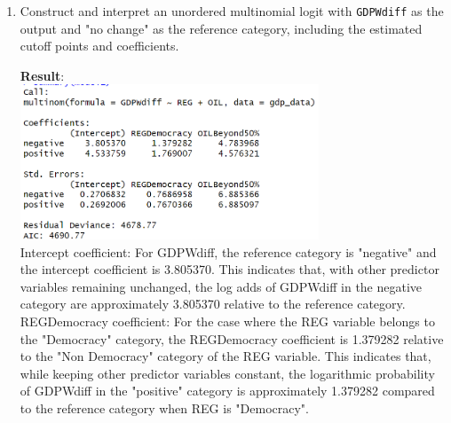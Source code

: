 \documentclass[12pt,letterpaper]{article}
\begin{document}
\begin{enumerate}
	\item Construct and interpret an unordered multinomial logit with \texttt{GDPWdiff} as the output and "no change" as the reference category, including the estimated cutoff points and coefficients.
	 
	\textbf{Result}:\\
	\includegraphics[width=0.7\textwidth]{Q1_1.png}\\
	Intercept coefficient: For GDPWdiff, the reference category is "negative" and the intercept coefficient is 3.805370. This indicates that, with other predictor variables remaining unchanged, the log adds of GDPWdiff in the negative category are approximately 3.805370 relative to the reference category.\\
	
	REGDemocracy coefficient: For the case where the REG variable belongs to the "Democracy" category, the REGDemocracy coefficient is 1.379282 relative to the "Non Democracy" category of the REG variable. This indicates that, while keeping other predictor variables constant, the logarithmic probability of GDPWdiff in the "positive" category is approximately 1.379282 compared to the reference category when REG is "Democracy".\\
	

\end{enumerate}
\end{document}
